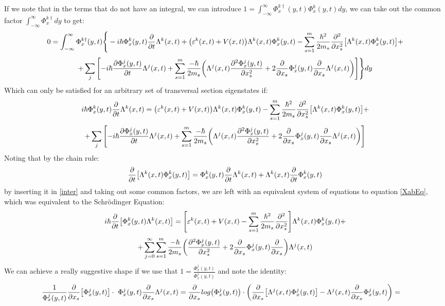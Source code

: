 \documentclass[11pt, a4paper]{article} %
\begin{document}
If we note that in the terms that do not have an integral, we can introduce $1=\int_{-\infty}^\infty \Phi^{k\dagger}_x(y,t) \Phi^k_x(y,t)dy$, we can take out the common factor $\int_{-\infty}^\infty\Phi^{k\dagger}_x dy$ to get:
\begin{equation}
0=\int_{-\infty}^\infty\Phi^{k\dagger}_x(y,t)\Bigg\{ -i\hbar \Phi^k_x(y,t)\pdv{}{t}\Lambda^k(x,t)+\qty( \varepsilon^k(x,t)+V(x,t) )\Lambda^k(x,t)\Phi^k_x(y,t) -\sum_{s=1}^m\frac{\hbar^2}{2m_s}\pdv[2]{}{x_s}\qty[\Lambda^k(x,t)\Phi^k_x(y,t) ]+
\end{equation}
$$
+\sum_j\qty[-i\hbar \pdv{\Phi^j_x(y,t)}{t}\Lambda^j(x,t)+\sum_{s=1}^m \frac{-\hbar}{2m_s}\qty( \Lambda^j(x,t)\pdv[2]{\Phi^j_x(y,t)}{x_s}+2\pdv{}{x_s}\Phi^j_x(y,t)\pdv{}{x_s}\Lambda^j(x,t) ) ]\Bigg\}dy
$$
Which can only be satisfied for an arbitrary set of transversal section eigenstates if:
\begin{equation}\label{inter}
 i\hbar \Phi^k_x(y,t)\pdv{}{t}\Lambda^k(x,t)=\qty( \varepsilon^k(x,t)+V(x,t) )\Lambda^k(x,t)\Phi^k_x(y,t) -\sum_{s=1}^m\frac{\hbar^2}{2m_s}\pdv[2]{}{x_s}\qty[\Lambda^k(x,t)\Phi^k_x(y,t) ]+
\end{equation}
$$
+\sum_j\qty[-i\hbar \pdv{\Phi^j_x(y,t)}{t}\Lambda^j(x,t)+\sum_{s=1}^m \frac{-\hbar}{2m_s}\qty( \Lambda^j(x,t)\pdv[2]{\Phi^j_x(y,t)}{x_s}+2\pdv{}{x_s}\Phi^j_x(y,t)\pdv{}{x_s}\Lambda^j(x,t) ) ]
$$
Noting that by the chain rule:
\begin{equation}
\pdv{}{t}\qty[\Lambda^k(x,t)\Phi^k_x(y,t)]=\Phi^k_x(y,t)\pdv{}{t}\Lambda^k(x,t)+\Lambda^k(x,t)\pdv{}{t}\Phi^k_x(y,t)
\end{equation}
by inserting it in \eqref{inter} and taking out some common factors, we are left with an equivalent system of equations to equation \eqref{XabEq}, which was equivalent to the Schrödinger Equation:
\begin{equation}\label{inter2}
 i\hbar\pdv{}{t}\qty[ \Phi^k_x(y,t)\Lambda^k(x,t)]=\qty[ \varepsilon^k(x,t)+V(x,t)  -\sum_{s=1}^m\frac{\hbar^2}{2m_s}\pdv[2]{}{x_s} ]\Lambda^k(x,t)\Phi^k_x(y,t)+
\end{equation}
$$
+\sum_{j=0}^\infty\sum_{s=1}^m \frac{-\hbar}{2m_s}\qty( \pdv[2]{\Phi^j_x(y,t)}{x_s}+2\pdv{}{x_s}\Phi^j_x(y,t)\pdv{}{x_s} )\Lambda^j(x,t)
$$
We can achieve a really suggestive shape if we use that $1=\frac{\Phi^j_x(y,t)}{\Phi^j_x(y,t)}$ and note the identity:\vspace{-0.2cm}
\begin{equation}
\hspace*{-0.4cm} \frac{1}{\Phi^j_x(y,t)}\pdv{}{x_s}\qty[\Phi^j_x(y,t)]\cdot\ \Phi^j_x(y,t)\pdv{}{x_s}\Lambda^j(x,t)=\pdv{}{x_s}log\qty(\Phi^j_x(y,t))\cdot \qty(\pdv{}{x_s}\qty[\Lambda^j(x,t)\Phi^j_x(y,t)]-\Lambda^j(x,t)\pdv{}{x_s}\Phi^j_x(y,t) )=
\end{equation}\vspace{-0.4cm}
\end{document}
